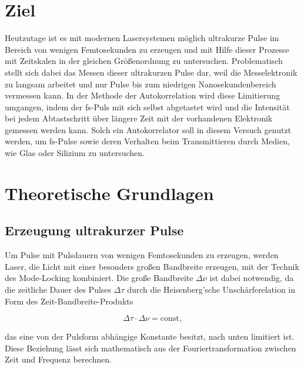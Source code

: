 \section{Ziel}
  Heutzutage ist es mit modernen Lasersystemen möglich ultrakurze Pulse im Bereich von wenigen Femtosekunden zu erzeugen und mit Hilfe dieser Prozesse mit Zeitskalen in der gleichen Größenordnung zu 
  untersuchen. Problematisch stellt sich dabei das Messen dieser ultrakurzen Pulse dar, weil die Messelektronik zu langsam arbeitet und nur Pulse bis zum niedrigen Nanosekundenbereich vermessen kann. In
  der Methode der Autokorrelation wird diese Limitierung umgangen, indem der fs-Puls mit sich selbst abgetastet wird und die Intensität bei jedem Abtastschritt über längere Zeit mit der vorhandenen 
  Elektronik gemessen werden kann. Solch ein Autokorrelator soll in diesem Versuch genutzt werden, um fs-Pulse sowie deren Verhalten beim Transmittieren durch Medien, wie Glas oder Silizium zu untersuchen.
    
\section{Theoretische Grundlagen}

  \subsection{Erzeugung ultrakurzer Pulse}
    Um Pulse mit Pulsdauern von wenigen Femtosekunden zu erzeugen, werden Laser, die Licht mit einer besonders großen Bandbreite erzeugen, mit der Technik des Mode-Locking kombiniert. Die große Bandbreite
    $\Delta\nu$ ist dabei notwendig, da die zeitliche Dauer des Pulses $\Delta\tau$ durch die Heisenberg'sche Unschärferelation in Form des Zeit-Bandbreite-Produkts 
    
    \begin{equation}
      \Delta\tau \cdot \Delta\nu = \text{const},
      \label{eqn:Heisenberg}
    \end{equation}
    
    das eine von der Pulsform abhängige Konstante besitzt, nach unten limitiert ist. Diese Beziehung lässt sich mathematisch aus der Fouriertransformation zwischen Zeit und Frequenz berechnen.


